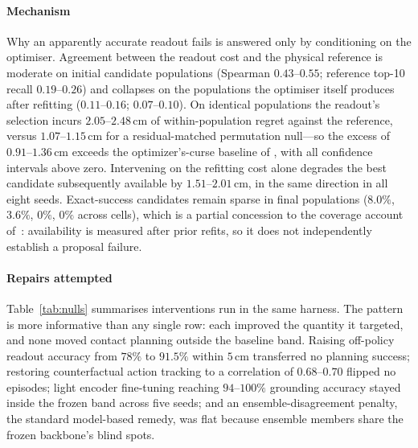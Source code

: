 \documentclass[11pt,letterpaper]{article}
\begin{document}
\paragraph{Mechanism}
Why an apparently accurate readout fails is answered only by conditioning on the
optimiser. Agreement between the readout cost and the physical reference is
moderate on initial candidate populations (Spearman $0.43$--$0.55$; reference
top-10 recall $0.19$--$0.26$) and collapses on the populations the optimiser
itself produces after refitting ($0.11$--$0.16$; $0.07$--$0.10$). On identical
populations the readout's selection incurs $2.05$--$2.48$\,cm of within-population
regret against the reference, versus $1.07$--$1.15$\,cm for a residual-matched
permutation null---so the excess of $0.91$--$1.36$\,cm exceeds the
optimizer's-curse baseline of \citet{smith2006optimizer}, with all confidence
intervals above zero. Intervening on the refitting cost alone degrades the best
candidate subsequently available by $1.51$--$2.01$\,cm, in the same direction in
all eight seeds. Exact-success candidates remain sparse in final populations
($8.0\%$, $3.6\%$, $0\%$, $0\%$ across cells), which is a partial concession to
the coverage account of~\citet{imwm2026}: availability is measured after prior
refits, so it does not independently establish a proposal failure.

\paragraph{Repairs attempted}
Table~\ref{tab:nulls} summarises interventions run in the same harness. The
pattern is more informative than any single row: each improved the quantity it
targeted, and none moved contact planning outside the baseline band. Raising
off-policy readout accuracy from $78\%$ to $91.5\%$ within $5$\,cm transferred no
planning success; restoring counterfactual action tracking to a correlation of
$0.68$--$0.70$ flipped no episodes; light encoder fine-tuning reaching
$94$--$100\%$ grounding accuracy stayed inside the frozen band across five seeds;
and an ensemble-disagreement penalty, the standard model-based remedy, was flat
because ensemble members share the frozen backbone's blind spots.
\end{document}
